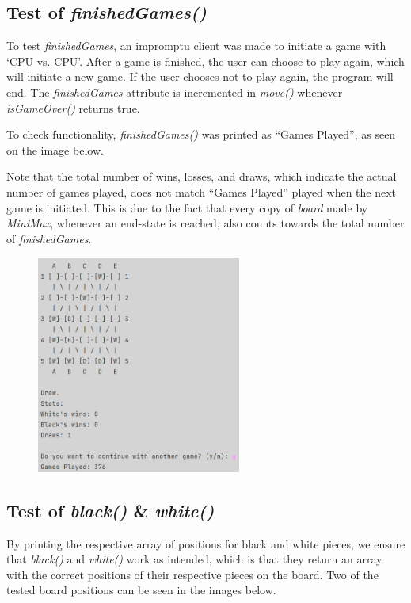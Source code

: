\documentclass[12pt, a4paper]{article}
\begin{document}
\subsection{Test of \emph{finishedGames()}}
To test \emph{finishedGames}, an impromptu client was made to initiate a game with ‘CPU vs. CPU’. After a game is finished, the user can choose to play again, which will initiate a new game. If the user chooses not to play again, the program will end. The \emph{finishedGames} attribute is incremented in \emph{move()} whenever \emph{isGameOver()} returns true. \par To check functionality, \emph{finishedGames()} was printed as “Games Played”, as seen on the image below. \par
Note that the total number of wins, losses, and draws, which indicate the actual number of games played, does not match “Games Played” played when the next game is initiated. This is due to the fact that every copy of \emph{board} made by \emph{MiniMax}, whenever an end-state is reached, also counts towards the total number of \emph{finishedGames}.

\begin{figure}[h]
	\centering
	\includegraphics[width=0.6\textwidth]{TestAfFinishedGames.png}	
\end{figure}
\newpage
\subsection{Test of \emph{black()} \& \emph{white()}}
By printing the respective array of positions for black and white pieces, we ensure that \emph{black()} and \emph{white()} work as intended, which is that they return an array with the correct positions of their respective pieces on the board. Two of the tested board positions can be seen in the images below.
\end{document}
